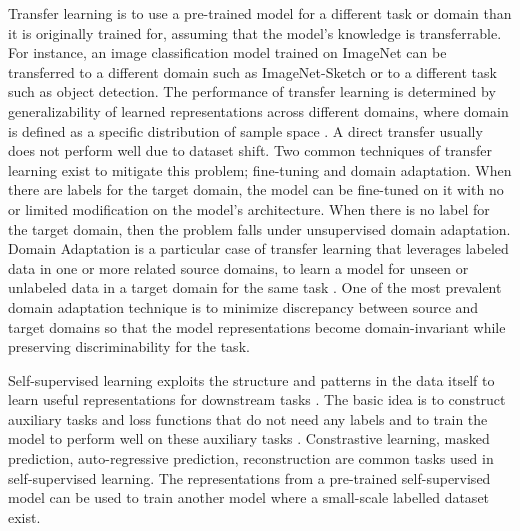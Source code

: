 \documentclass[conference]{IEEEtran}
\begin{document}
Transfer learning is to use a pre-trained model for a different task or domain than it is originally trained for, assuming that the model's knowledge is transferrable. For instance, an image classification model trained on ImageNet \cite{deng2009imagenet} can be transferred to a different domain such as ImageNet-Sketch \cite{wang2019learning} or to a different task such as object detection. The performance of transfer learning is determined by generalizability of learned representations across different domains, where domain is defined as a specific distribution of sample space \cite{kouw2019review}. A direct transfer usually does not perform well due to dataset shift. Two common techniques of transfer learning exist to mitigate this problem; fine-tuning and domain adaptation. When there are labels for the target domain, the model can be fine-tuned on it with no or limited modification on the model's architecture. When there is no label for the target domain, then the problem falls under unsupervised domain adaptation. Domain Adaptation is a particular case of transfer learning that leverages labeled data in one or more related source domains, to learn a model for unseen or unlabeled data in a target domain for the same task \cite{Csurka2017}. One of the most prevalent domain adaptation technique is to minimize discrepancy between source and target domains so that the model representations become domain-invariant while preserving discriminability for the task.  

Self-supervised learning exploits the structure and patterns in the data itself to learn useful representations for downstream tasks \cite{Zhao2022}. The basic idea is to construct auxiliary tasks and loss functions that do not need any labels and to train the model to perform well on these auxiliary tasks \cite{Zhao2022}. Constrastive learning, masked prediction, auto-regressive prediction, reconstruction are common tasks used in self-supervised learning. The representations from a pre-trained self-supervised model can be used to train another model where a small-scale labelled dataset exist. 
\end{document}
